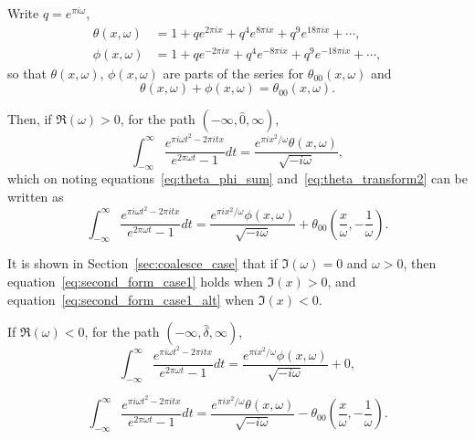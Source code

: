 \documentclass[12pt]{article}
\theoremstyle{remark}
\begin{document}
Write $q = e^{\pi i\omega}$,
\begin{align}
\theta(x, \omega) &= 1 + q e^{2\pi ix} + q^4 e^{8\pi ix} + q^9 e^{18\pi ix} + \cdots, \label{eq:theta_def}\\
\phi(x, \omega) &= 1 + q e^{-2\pi ix} + q^4 e^{-8\pi ix} + q^9 e^{-18\pi ix} + \cdots, \label{eq:phi_def}
\end{align}
so that $\theta(x, \omega)$, $\phi(x, \omega)$ are parts of the series for $\theta_{00}(x, \omega)$ and
\begin{equation}\label{eq:theta_phi_sum}
\theta(x, \omega) + \phi(x, \omega) = \theta_{00}(x, \omega).
\end{equation}

Then, if $\Re(\omega) > 0$, for the path $(-\infty, \hat{0}, \infty)$,
\begin{equation}\label{eq:second_form_case1}
\int_{-\infty}^\infty \frac{e^{\pi i\omega t^2 - 2\pi itx}}{e^{2\pi\omega t} - 1} dt = \frac{e^{\pi ix^2/\omega} \theta(x, \omega)}{\sqrt{-i\omega}},
\end{equation}
which on noting equations~\eqref{eq:theta_phi_sum} and~\eqref{eq:theta_transform2} can be written as
\begin{equation}\label{eq:second_form_case1_alt}
\int_{-\infty}^\infty \frac{e^{\pi i\omega t^2 - 2\pi itx}}{e^{2\pi\omega t} - 1} dt = \frac{e^{\pi ix^2/\omega} \phi(x, \omega)}{\sqrt{-i\omega}} + \theta_{00}\left(\frac{x}{\omega}, -\frac{1}{\omega}\right).
\end{equation}

It is shown in Section~\ref{sec:coalesce_case} that if $\Im(\omega) = 0$ and $\omega > 0$, then equation~\eqref{eq:second_form_case1} holds when $\Im(x) > 0$, and equation~\eqref{eq:second_form_case1_alt} when $\Im(x) < 0$.

If $\Re(\omega) < 0$, for the path $(-\infty, \hat{\delta}, \infty)$,
\begin{equation}\label{eq:second_form_case2}
\int_{-\infty}^\infty \frac{e^{\pi i\omega t^2 - 2\pi itx}}{e^{2\pi\omega t} - 1} dt = \frac{e^{\pi ix^2/\omega} \phi(x, \omega)}{\sqrt{-i\omega}} + 0,
\end{equation}

\begin{equation}\label{eq:second_form_case2_alt}
\int_{-\infty}^\infty \frac{e^{\pi i\omega t^2 - 2\pi itx}}{e^{2\pi\omega t} - 1} dt = \frac{e^{\pi ix^2/\omega} \theta(x, \omega)}{\sqrt{-i\omega}} - \theta_{00}\left(\frac{x}{\omega}, -\frac{1}{\omega}\right).
\end{equation}
\end{document}
